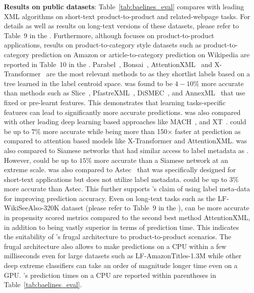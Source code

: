 \textbf{Results on public datasets}: Table~\ref{tab:baelines_eval} compares \alg with leading XML algorithms on short-text product-to-product and related-webpage tasks. For details as well as results on long-text versions of these datasets, please refer to Table~9 in the \suppl. Furthermore, although \alg focuses on product-to-product applications, results on product-to-category style datasets such as product-to-category prediction on Amazon or article-to-category prediction on Wikipedia are reported in Table~10 in the \suppl. Parabel~\citep{Prabhu18}, Bonsai~\citep{Khandagale19}, AttentionXML~\citep{You18} and X-Transformer~\citep{Chang20} are the most relevant methods to \alg as they shortlist labels based on a tree learned in the label centroid space. \alg was found to be $4-10\%$ more accurate than methods such as Slice~\cite{Jain19}, PfastreXML~\cite{Jain17}, DiSMEC~\cite{Babbar17}, and AnnexML~\cite{Tagami17} that use fixed or pre-learnt features. This demonstrates that learning tasks-specific features can lead to significantly more accurate predictions. \alg was also compared with other leading deep learning based approaches like MACH~\citep{Medini2019}, and XT~\cite{Wydmuch18}. \alg could be up to $7\%$ more accurate while being more than 150$\times$ faster at prediction as compared to attention based models like X-Transformer and AttentionXML. \alg was also compared to Siamese networks that had similar access to label metadata as \alg. However, \alg could be up to $15\%$ more accurate than a Siamese network at an extreme scale. \alg was also compared to Astec~\citep{Dahiya21} that was specifically designed for short-text applications but does not utilize label metadata. \alg could be up to 3\% more accurate than Astec. This further supports \alg's claim of using label meta-data for improving prediction accuracy. Even on long-text tasks such as the LF-WikiSeeAlso-320K dataset (please refer to Table~9 in the \suppl), \alg can be more accurate in propensity scored metrics compared to the second best method AttentionXML, in addition to being vastly superior in terms of prediction time. This indicates the suitability of \alg's frugal architecture to product-to-product scenarios. The frugal architecture also allows \alg to make predictions on a CPU within a few milliseconds even for large datasets such as LF-AmazonTitles-1.3M while other deep extreme classifiers can take an order of magnitude longer time even on a GPU. \alg's prediction times on a CPU are reported within parentheses in Table~\ref{tab:baelines_eval}.

